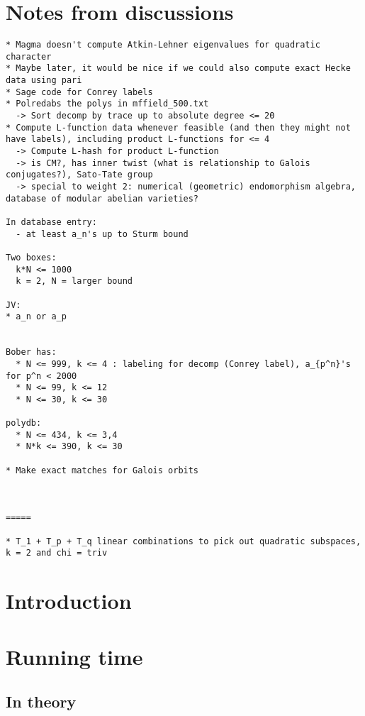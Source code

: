 \documentclass[11pt]{amsart}
\numberwithin{equation}{subsection}
\theoremstyle{definition}
\begin{document}
\section{Notes from discussions}

\begin{verbatim}
* Magma doesn't compute Atkin-Lehner eigenvalues for quadratic character
* Maybe later, it would be nice if we could also compute exact Hecke data using pari
* Sage code for Conrey labels
* Polredabs the polys in mffield_500.txt
  -> Sort decomp by trace up to absolute degree <= 20
* Compute L-function data whenever feasible (and then they might not have labels), including product L-functions for <= 4
  -> Compute L-hash for product L-function
  -> is CM?, has inner twist (what is relationship to Galois conjugates?), Sato-Tate group
  -> special to weight 2: numerical (geometric) endomorphism algebra, database of modular abelian varieties?

In database entry:
  - at least a_n's up to Sturm bound
           
Two boxes:
  k*N <= 1000
  k = 2, N = larger bound
           
JV:
* a_n or a_p


Bober has:
  * N <= 999, k <= 4 : labeling for decomp (Conrey label), a_{p^n}'s for p^n < 2000 
  * N <= 99, k <= 12 
  * N <= 30, k <= 30 

polydb: 
  * N <= 434, k <= 3,4
  * N*k <= 390, k <= 30
  
* Make exact matches for Galois orbits



=====

* T_1 + T_p + T_q linear combinations to pick out quadratic subspaces, k = 2 and chi = triv

\end{verbatim}

\section{Introduction}

\section{Running time}

\subsection{In theory}
\end{document}

